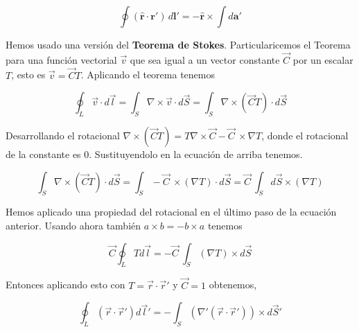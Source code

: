 \documentclass[12pt,a4paper]{report}
\newcommand{\esp}{\vspace{0.5cm}}
\begin{document}
	\begin{equation}
		\oint (\mathbf{\hat{r}} \cdot \mathbf{r}') \, d\mathbf{l}' = -\mathbf{\hat{r}} \times \int d\mathbf{a}'
	\end{equation}
	
	\esp
	
	\begin{nota}
		Hemos usado una versión del \textbf{Teorema de Stokes}. Particularicemos el Teorema para una función vectorial $\vec{v}$ que sea igual a un vector constante $\vec{C}$ por un escalar $T$, esto es $\vec{v}=\vec{C}T$. Aplicando el teorema tenemos
		
		\esp
		
		\begin{equation}
			\oint_L \vec{v} \cdot d\vec{l} = \int_S \nabla \times \vec{v} \cdot d\vec{S} = \int_S \nabla \times (\vec{C}T) \cdot d\vec{S} 
		\end{equation}
		
		\esp
		
		Desarrollando el rotacional $\nabla \times (\vec{C}T) = T \nabla \times \vec{C} - \vec{C}\ \times \nabla T$, donde el rotacional de la constante es 0. Sustituyendolo en la ecuación de arriba tenemos.
		
		\esp
		
		\begin{equation}
			\int_S \nabla \times (\vec{C}T) \cdot d\vec{S} = \int_S - \vec{C}\ \times (\nabla  T) \cdot d\vec{S} = \vec{C}\ \int_S d\vec{S} \times (\nabla T)
		\end{equation}
		
		\esp
		
		Hemos aplicado una propiedad del rotacional en el último paso de la ecuación anterior. Usando ahora también $a\times b = -b \times a$ tenemos
		
		\esp
		
		\begin{equation}
			\vec{C} \oint_L T d\vec{l} = - \vec{C}\ \int_S (\nabla T) \times d\vec{S} 
		\end{equation}
		
		\esp
		
		Entonces aplicando esto con $T=\vec{r} \cdot \vec{r}'$ y $\vec{C} = 1$ obtenemos,
		
		\esp
		
		\begin{equation}
			\oint_L (\vec{r} \cdot \vec{r}') d\vec{l}' = - \int_S (\nabla' (\vec{r} \cdot \vec{r}')) \times d\vec{S}'
		\end{equation}
		

\end{nota}
\end{document}
